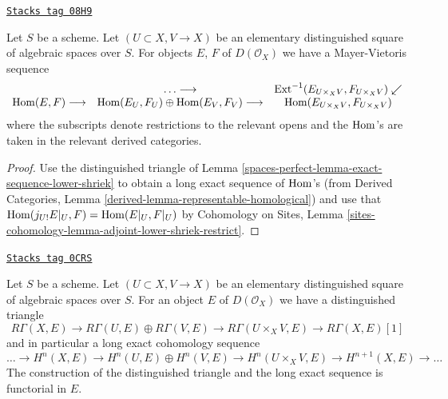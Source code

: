 \begin{lemma}
\label{spaces-perfect-lemma-mayer-vietoris-hom}
\href{https://stacks.math.columbia.edu/tag/08H9}{\texttt{Stacks tag 08H9}}

Let $S$ be a scheme. Let $(U \subset X, V \to X)$ be an elementary
distinguished square of algebraic spaces over $S$.
For objects $E$, $F$ of $D(\mathcal{O}_X)$ we have a
Mayer-Vietoris sequence
$$
\begin{array}{ccc} & \ldots \longrightarrow & \operatorname{Ext}^{-1}(E_{U \times_X V}, F_{U \times_X V}) \swarrow \\ \operatorname{Hom}(E, F) \longrightarrow & \operatorname{Hom}(E_U, F_U) \oplus
\operatorname{Hom}(E_V, F_V) \longrightarrow & \operatorname{Hom}(E_{U \times_X V}, F_{U \times_X V})\end{array}
$$
where the subscripts denote restrictions to the relevant opens
and the $\operatorname{Hom}$'s are taken in the relevant derived categories.
\end{lemma}

\begin{proof}
Use the distinguished triangle of
Lemma \ref{spaces-perfect-lemma-exact-sequence-lower-shriek}
to obtain a long exact sequence of $\operatorname{Hom}$'s
(from Derived Categories, Lemma \ref{derived-lemma-representable-homological})
and use that $\operatorname{Hom}(j_{U!}E|_U, F) = \operatorname{Hom}(E|_U, F|_U)$
by Cohomology on Sites, Lemma
\ref{sites-cohomology-lemma-adjoint-lower-shriek-restrict}.
\end{proof}

\begin{lemma}
\label{spaces-perfect-lemma-unbounded-mayer-vietoris}
\href{https://stacks.math.columbia.edu/tag/0CRS}{\texttt{Stacks tag 0CRS}}

Let $S$ be a scheme. Let $(U \subset X, V \to X)$ be an elementary
distinguished square of algebraic spaces over $S$. For an object $E$
of $D(\mathcal{O}_X)$ we have a distinguished triangle
$$
R\Gamma(X, E) \to R\Gamma(U, E) \oplus R\Gamma(V, E) \to
R\Gamma(U \times_X V, E) \to R\Gamma(X, E)[1]
$$
and in particular a long exact cohomology sequence
$$
\ldots \to
H^n(X, E) \to
H^n(U, E) \oplus H^n(V, E) \to
H^n(U \times_X V, E) \to
H^{n + 1}(X, E) \to \ldots
$$
The construction of the distinguished triangle and the
long exact sequence is functorial in $E$.
\end{lemma}

